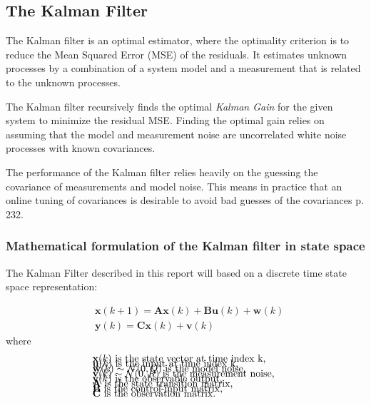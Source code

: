 \subsection{The Kalman Filter} \label{sec:the_kalman_filter}
The Kalman filter is an optimal estimator, where the optimality criterion is to reduce the Mean Squared Error (MSE) of the residuals.
It estimates unknown processes by a combination of a system model and a measurement that is related to the unknown processes. 

The Kalman filter recursively finds the optimal \textit{Kalman Gain} for the given system to minimize the residual MSE. Finding the optimal gain relies on assuming that the model and measurement noise are uncorrelated white noise processes with known covariances. 

The performance of the Kalman filter relies heavily on the guessing the covariance of measurements and model noise. This means in practice that an online tuning of covariances is desirable to avoid bad guesses of the covariances \cite{Doraiswami2014} p. 232.

\subsubsection{Mathematical formulation of the Kalman filter in state space}
The Kalman Filter described in this report will based on a discrete time state space representation: 

\begin{align}
	&\textbf{x}(k+1) = \textbf{A}\textbf{x}(k) + \textbf{B}\textbf{u}(k) + \textbf{w}(k)  \label{eq:KalmanSystemEquations} \\
	&\textbf{y}(k) = \textbf{C}\textbf{x}(k)+\textbf{v}(k) 
\end{align}
where 
\begin{align*}
	&\text{$\textbf{x}(k)$ is the state vector at time index k,					}	\\[-1em]
	&\text{$\textbf{u}(k)$ is the input at time index k, 						}	\\[-1em]
	&\text{$\textbf{w}(k) \sim \mathcal{N}(0, Q)$ is the model noise,			}	\\[-1em]
	&\text{$\textbf{v}(k) \sim \mathcal{N}(0, R)$ is the measurement noise,		}	\\[-1em]
	&\text{$\textbf{y}(k)$ is the observable output, 							}	\\[-1em]
	&\text{\textbf{A} is the state transition matrix,							}	\\[-1em]
	&\text{\textbf{B} is the control-input matrix,								}	\\[-1em]
	&\text{\textbf{C} is the observation matrix. 								}	\\[-1em]
\end{align*}

